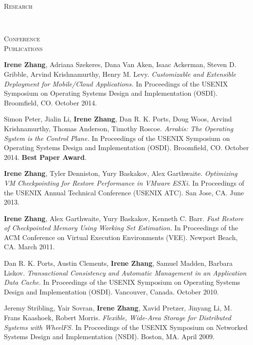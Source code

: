 \documentclass[10pt,times]{report}
\newlength{\sectiongap}
\newlength{\sectioncolwidth}
\newlength{\colgap}
\newlength{\stuffwidth}
\newenvironment{rtable}{
  \begin{minipage}{\textwidth}
  }{
  \end{minipage}
}
\newenvironment{rsection}[1]{
  \begin{minipage}[t]{\sectioncolwidth}
    \textsc{#1}
  \end{minipage}
  \hspace{\colgap}
  \begin{minipage}[t]{\stuffwidth}
  }{
    \removelastskip
  \end{minipage}
  \\[\sectiongap]
}
\begin{document}
\begin{rtable}
\begin{rsection}{Research}
  \end{rsection}
\end{rtable}

\begin{rtable}
 \begin{rsection}{Conference\\Publications}
   \textbf{Irene Zhang}, Adriana Szekeres, Dana Van Aken, Isaac
   Ackerman, Steven D. Gribble, Arvind Krishnamurthy, Henry
   M. Levy. \textit{Customizable and Extensible Deployment for
     Mobile/Cloud Applications.}  In Proceedings of the USENIX Symposium
   on Operating Systems Design and
   Implementation (OSDI). Broomfield, CO. October 2014.\\ \vspace{-0.5em}

   Simon Peter, Jialin Li, \textbf{Irene Zhang}, Dan R. K. Ports, Doug
   Woos, Arvind Krishnamurthy, Thomas Anderson, Timothy Roscoe.
   \textit{Arrakis: The Operating System is the Control Plane.}  In
   Proceedings of the USENIX Symposium on Operating Systems Design and
   Implementation (OSDI).
   Broomfield, CO. October 2014. \textbf{Best Paper
     Award}.\\\vspace{-0.5em}

   \textbf{Irene Zhang}, Tyler Denniston, Yury Baskakov, Alex
   Garthwaite.   \textit{Optimizing VM Checkpointing for Restore
     Performance in VMware ESXi.}
   In Proceedings of the USENIX Annual Technical Conference (USENIX ATC).
   San Jose, CA. June 2013.\\\vspace{-0.5em}

   \textbf{Irene Zhang}, Alex Garthwaite, Yury Baskakov, Kenneth
   C. Barr. \textit{Fast Restore of Checkpointed Memory Using Working
     Set Estimation.}  In Proceedings of the ACM Conference on Virtual
   Execution Environments (VEE). Newport Beach, CA. March 2011.\\\vspace{-0.5em}

   Dan R. K. Ports, Austin Clements, \textbf{Irene Zhang}, Samuel
   Madden, Barbara Liskov. \textit{Transactional Consistency and
     Automatic Management in an Application Data Cache.}  In
   Proceedings of the USENIX Symposium on Operating Systems Design and
   Implementation (OSDI). Vancouver, Canada. October 2010.\\\vspace{-0.5em}

   Jeremy Stribling, Yair Sovran, \textbf{Irene Zhang}, Xavid Pretzer,
   Jinyang Li, M. Frans Kaashoek, Robert Morris. \textit{Flexible,
     Wide-Area Storage for Distributed Systems with WheelFS.}  In
   Proceedings of the USENIX Symposium on Networked Systems Design and
   Implementation (NSDI).  Boston, MA. April 2009. \\\vspace{-0.5em}
  \end{rsection}


\end{rtable}
\end{document}
